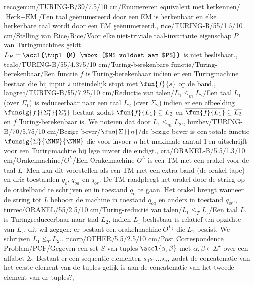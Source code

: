 recogenum/TURING-B/39/7.5/10 cm/Enumereren equivalent met herkennen/$\mbox{Herk}\equiv\mbox{EM}$/{Een taal ge\"enumereerd door een EM is herkenbaar en elke herkenbare taal wordt door een EM ge\"enumereerd.},
rice/TURING-B/55/1.5/10 cm/Stelling van Rice/Rice/{Voor elke niet-triviale taal-invariante eigenschap $P$ van Turingmachines geldt $L_{P}=\accl{\tupl{M}|\mbox{$M$ voldoet aan $P$}}$ is niet beslisbaar.},
tcalc/TURING-B/55/4.375/10 cm/Turing-berekenbare functie/Turing-berekenbaar/{Een functie $f$ is Turing-berekenbaar indien er een Turingmachine bestaat die bij input $s$ uiteindelijk stopt met $\fun{f}{s}$ op de band.},
langrec/TURING-B/55/7.25/10 cm/Reductie van talen/$L_1\leq_mL_2$/{Een taal $L_1$ (over $\Sigma_1$) is reduceerbaar naar een taal $L_2$ (over $\Sigma_2$) indien er een afbeelding $\funsig{f}{\Sigma_1^{\star}}{\Sigma_2^{\star}}$ bestaat zodat $\fun{f}{L_1}\subseteq L_2$ en $\overline{\fun{f}{L_1}}\subseteq\overline{L_2}$ en $f$ Turing-berekenbaar is. We noteren dat door $L_1\leq_mL_2$.},
buzbev/TURING-B/70/5.75/10 cm/Bezige bever/$\fun{\Sigma}{n}$/{de bezige bever is een totale functie $\funsig{\Sigma}{\NNN}{\NNN}$ die voor invoer $n$ het maximale aantal $1$'en uitschrijft voor een Turingmachine bij lege invoer die eindigt.},
ora/ORAKEL-B/5.5/1.3/10 cm/Orakelmachine/$O^L$/{Een Orakelmachine $O^L$ is een TM met een orakel voor de taal $L$. Men kan dit voorstellen als een TM met een extra band (de orakel-tape) en drie toestanden $q_o$, $q_{oa}$ en $q_{or}$. De TM raadpleegt het orakel door de string op de orakelband te schrijven en in toestand $q_o$ te gaan. Het orakel brengt wanneer de string tot $L$ behoort de machine in toestand $q_{oa}$ en anders in toestand $q_{or}$.},
turrec/ORAKEL/55/2.5/10 cm/Turing-reductie van talen/$L_1\leq_TL_2$/{Een taal $L_1$ is Turingreduceerbaar naar taal $L_2$, indien $L_1$ beslisbaar is relatief ten opzichte van $L_2$, dit wil zeggen: er bestaat een orakelmachine $O^{L_2}$ die $L_1$ beslist. We schrijven $L_1\leq_TL_2$.},
pcorp/OTHER/5.5/2.5/10 cm/Post Correspondence Problem/PCP/{Gegeven een set $S$ van tuples $\accl{\alpha,\beta}$ met $\alpha,\beta\in\Sigma^{\star}$ over een alfabet $\Sigma$. Bestaat er een sequentie elementen $s_0s_1\ldots s_n$, zodat de concatenatie van het eerste element van de tuples gelijk is aan de concatenatie van het tweede element van de tuples?},
